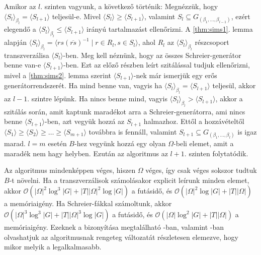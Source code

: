 Amikor az $l$. szinten vagyunk, a következő történik:
Megnézzük, hogy $\langle S_l \rangle_{\beta_l} = \langle S_{l+1} \rangle$ teljesül-e.
Mivel $\langle S_l \rangle \ge \langle S_{l+1} \rangle$, valamint $S_l \subseteq G_{(\beta_1, \dots, \beta_{l-1})}$, ezért elegendő a $\langle S_l \rangle_{\beta_l} \le \langle S_{l+1} \rangle$ irányú tartalmazást ellenőrizni.
A \ref{thm:sims1}. lemma alapján $\langle S_l \rangle_{\beta_l} = \langle rs(\overline{rs})^{-1} \mid r\in R_l, s\in S_l \rangle$, ahol $R_l$ az $\langle S_l \rangle_{\beta_l}$ részcsoport transzverzálisa $\langle S_l \rangle$-ben.
Meg kell néznünk, hogy az összes Schreier-generátor benne van-e $\langle S_{l+1} \rangle$-ben.
Ezt az előző részben leírt szitálással tudjuk ellenőrizni, mivel a \ref{thm:sims2}. lemma szerint $\langle S_{l+1} \rangle$-nek már ismerjük egy erős generátorrendszerét.
Ha mind benne van, vagyis ha $\langle S_l \rangle_{\beta_l} = \langle S_{l+1} \rangle$ teljesül, akkor az $l-1$. szintre lépünk.
Ha nincs benne mind, vagyis $\langle S_l \rangle_{\beta_l} > \langle S_{l+1} \rangle$, akkor a szitálás során, amit kaptunk maradékot arra a Schreier-generátorra, ami nincs benne $\langle S_{l+1} \rangle$-ben,
azt vegyük hozzá az $S_{l+1}$ halmazhoz.
Ettől a hozzávételtől $\langle S_1 \rangle \ge \langle S_2 \rangle \ge \dots \ge \langle S_{m+1} \rangle$ továbbra is fennáll, valamint $S_{l+1} \subseteq G_{(\beta_1, \dots, \beta_{l})}$ is igaz marad.
$l = m$ esetén $B$-hez vegyünk hozzá egy olyan $\Omega$-beli elemet, amit a maradék nem hagy helyben.
Ezután az algoritmus az $l+1$. szinten folytatódik.

Az algoritmus mindenképpen véges, hiszen $\Omega$ véges, így csak véges sokszor tudtuk $B$-t növelni.
Ha a transzverzálisok számolásakor explicit leírunk minden elemet, akkor $\mathcal{O}(|\Omega|^2 \log^3|G| + |T||\Omega|^2 \log|G|)$ a futásidő, és $\mathcal{O}(|\Omega|^2 \log|G| + |T||\Omega|)$ a memóriaigény.
Ha Schreier-fákkal számoltunk, akkor $\mathcal{O}(|\Omega|^3 \log^3|G| + |T||\Omega|^3 \log|G|)$ a futásidő, és $\mathcal{O}(|\Omega| \log^2|G| + |T||\Omega|)$ a memóriaigény.
Ezeknek a bizonyítása megtalálható \cite{Ser03}-ban, valamint \cite{Mur03}-ban olvashatjuk az algoritmusnak rengeteg változatát részletesen elemezve, hogy mikor melyik a legalkalmasabb.

